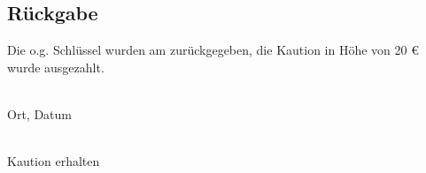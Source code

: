 \documentclass[ngerman,a4wide]{scrartcl}
\newcommand{\kaution}{
	20
}
\begin{document}
\begin{Form}
\section*{Rückgabe}
Die o.g. Schlüssel wurden am \TextField[name=date2,width=7em,%
bordercolor={0.65 0.79 0.94}]{} zurückgegeben, die Kaution in Höhe von\kaution€ wurde ausgezahlt.\\
\vfill
\begin{minipage}{5cm}
 \dotfill\\
 Ort, Datum
\end{minipage}
\hspace{1cm}
\begin{minipage}{5cm}
 \dotfill\\
 Kaution erhalten
\end{minipage}

\end{Form}
\end{document}
